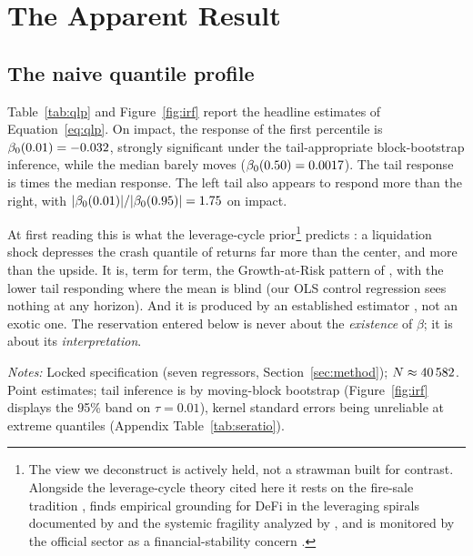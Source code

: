 \section{The Apparent Result}
\label{sec:apparent}

\subsection{The naive quantile profile}

Table~\ref{tab:qlp} and Figure~\ref{fig:irf} report the headline estimates
of Equation~\eqref{eq:qlp}. On impact, the response of the first percentile
is $\beta_0(0.01) = -0.032$, strongly significant under the
tail-appropriate block-bootstrap inference, while the median barely moves
($\beta_0(0.50) = 0.0017$). The tail response is
\RatioTailMedImpact{} times the median response. The left tail also appears
to respond more than the right, with $|\beta_0(0.01)|/|\beta_0(0.95)| =
1.75$ on impact.

At first reading this is what the leverage-cycle prior\footnote{The
view we deconstruct is actively held, not a strawman built for contrast.
Alongside the leverage-cycle theory cited here it rests on the fire-sale
tradition \citep{shleifer1992}, finds empirical grounding for DeFi in the
leveraging spirals documented by \citet{perez2021} and the systemic
fragility analyzed by \citet{lehar2022}, and is monitored by the official
sector as a financial-stability concern \citep{oecd2023,fsb2023}.} predicts
\citep{geanakoplos2010,brunnermeier2009}: a liquidation shock depresses the
crash quantile of returns far more than the center, and more than the
upside. It is, term for term, the Growth-at-Risk pattern of
\citet{adrian2019}, with the lower tail responding where the mean is blind
(our OLS control regression sees nothing at any horizon). And it is produced
by an established estimator \citep{han2024}, not an exotic one. The
reservation entered below is never about the \emph{existence} of
$\beta$; it is about its \emph{interpretation}.

\begin{table}[t]
\centering
\caption{Quantile local projections: $\beta_h(\tau)$ of cumulative ETH
returns on the liquidation shock.}
\label{tab:qlp}

\begin{minipage}{0.92\textwidth}
\vspace{2pt}
{\scriptsize \emph{Notes:} Locked specification (seven regressors,
Section~\ref{sec:method}); $N \approx 40\,582$. Point estimates; tail
inference is by moving-block bootstrap (Figure~\ref{fig:irf} displays the
95\% band on $\tau=0.01$), kernel standard errors being unreliable at
extreme quantiles (Appendix Table~\ref{tab:seratio}).}
\end{minipage}
\end{table}

